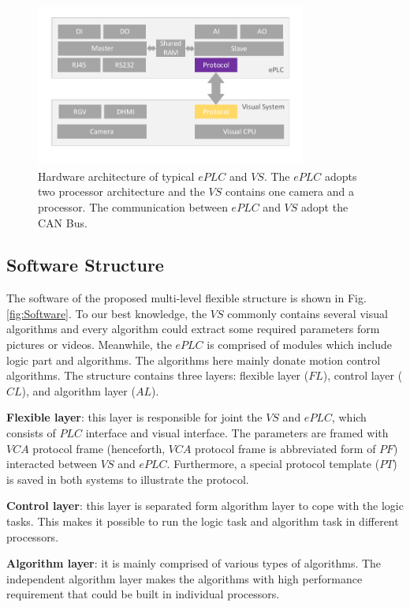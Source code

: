 \documentclass[journal,UTF8]{IEEEtran}
\begin{document}
\begin{figure}
	\centering
	\includegraphics[width=3.5in]{fig/Hardware.pdf}
	\caption{Hardware architecture of typical $ePLC$ and $VS$. The $ePLC$ adopts two processor architecture and the $VS$ contains one camera and a processor. The communication between $ePLC$ and $VS$ adopt the CAN Bus.}
	\label{fig:Hardware}
\end{figure}
\subsection{Software Structure}
The software of the proposed multi-level flexible structure is shown in Fig. \ref{fig:Software}. To our best knowledge, the $VS$ commonly contains several visual algorithms and every algorithm could extract some required parameters form pictures or videos. Meanwhile, the $ePLC$ is comprised of modules which include logic part and algorithms. The algorithms here mainly donate motion control algorithms. The structure contains three layers: flexible layer ($FL$), control layer ($CL$), and algorithm layer ($AL$).

\textbf{Flexible layer}: this layer is responsible for joint the $VS$ and $ePLC$, which consists of $PLC$ interface and visual interface. The parameters are framed with $VCA$ protocol frame (henceforth, $VCA$ protocol frame is abbreviated form of $PF$) interacted between $VS$ and $ePLC$. Furthermore, a special protocol template ($PT$) is saved in both systems to illustrate the protocol.

\textbf{Control layer}: this layer is separated form algorithm layer to cope with the logic tasks. This makes it possible to run the logic task and algorithm task in different processors.

\textbf{Algorithm layer}: it is mainly comprised of various types of algorithms. The independent algorithm layer makes the algorithms with high performance requirement that could be built in individual processors. 
\end{document}

